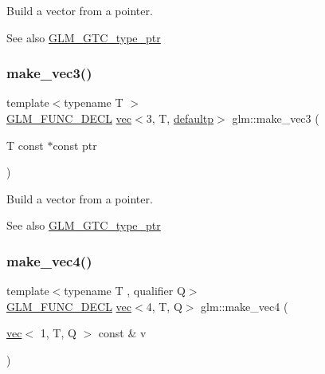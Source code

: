 Build a vector from a pointer. \begin{DoxySeeAlso}{See also}
\hyperlink{group__gtc__type__ptr}{G\+L\+M\+\_\+\+G\+T\+C\+\_\+type\+\_\+ptr} 
\end{DoxySeeAlso}
\mbox{\label{group__gtc__type__ptr_gad9e0d36ff489cb30c65ad1fa40351651}} 
\subsubsection{\texorpdfstring{make\+\_\+vec3()}{make\_vec3()}\hspace{0.1cm}{\footnotesize\ttfamily [5/5]}}
{\footnotesize\ttfamily template$<$typename T $>$ \\
\hyperlink{setup_8hpp_ab2d052de21a70539923e9bcbf6e83a51}{G\+L\+M\+\_\+\+F\+U\+N\+C\+\_\+\+D\+E\+CL} \hyperlink{structglm_1_1vec}{vec}$<$3, T, \hyperlink{namespaceglm_a36ed105b07c7746804d7fdc7cc90ff25a9d21ccd8b5a009ec7eb7677befc3bf51}{defaultp}$>$ glm\+::make\+\_\+vec3 (\begin{DoxyParamCaption}\item[{T const $\ast$const}]{ptr }\end{DoxyParamCaption})}

Build a vector from a pointer. \begin{DoxySeeAlso}{See also}
\hyperlink{group__gtc__type__ptr}{G\+L\+M\+\_\+\+G\+T\+C\+\_\+type\+\_\+ptr} 
\end{DoxySeeAlso}
\mbox{\label{group__gtc__type__ptr_ga600cb97f70c5d50d3a4a145e1cafbf37}} 
\subsubsection{\texorpdfstring{make\+\_\+vec4()}{make\_vec4()}\hspace{0.1cm}{\footnotesize\ttfamily [1/5]}}
{\footnotesize\ttfamily template$<$typename T , qualifier Q$>$ \\
\hyperlink{setup_8hpp_ab2d052de21a70539923e9bcbf6e83a51}{G\+L\+M\+\_\+\+F\+U\+N\+C\+\_\+\+D\+E\+CL} \hyperlink{structglm_1_1vec}{vec}$<$4, T, Q$>$ glm\+::make\+\_\+vec4 (\begin{DoxyParamCaption}\item[{\hyperlink{structglm_1_1vec}{vec}$<$ 1, T, Q $>$ const \&}]{v }\end{DoxyParamCaption})\hspace{0.3cm}{\ttfamily [inline]}}

